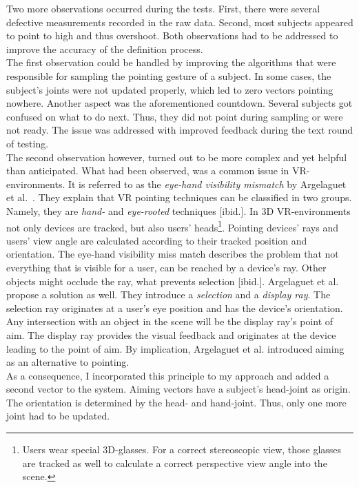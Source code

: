 Two more observations occurred during the tests. First, there were several defective measurements recorded in the raw data. Second, most subjects appeared to point to high and thus overshoot. Both observations had to be addressed to improve the accuracy of the definition process.
\\
The first observation could be handled by improving the algorithms that were responsible for sampling the pointing gesture of a subject. In some cases, the subject's joints were not updated properly, which led to zero vectors pointing nowhere. Another aspect was the aforementioned countdown. Several subjects got confused on what to do next. Thus, they did not point during sampling or were not ready. The issue was addressed with improved feedback during the text round of testing.
\\
The second observation however, turned out to be more complex and yet helpful than anticipated. What had been observed, was a common issue in \ac{VR}-environments. It is referred to as the \textit{eye-hand visibility mismatch} by Argelaguet et al.~\cite{EyeHandMissmatchVR}. They explain that \ac{VR} pointing techniques can be classified in two groups. Namely, they are \textit{hand-} and \textit{eye-rooted} techniques [ibid.]. In \ac{3D} \ac{VR}-environments not only devices are tracked, but also users' heads\footnote{Users wear special \ac{3D}-glasses. For a correct stereoscopic view, those glasses are tracked as well to calculate a correct perspective view angle into the scene.}. Pointing devices' rays and users' view angle are calculated according to their tracked position and orientation. The eye-hand visibility miss match describes the problem that not everything that is visible for a user, can be reached by a device's ray. Other objects might occlude the ray, what prevents selection [ibid.]. Argelaguet et al. propose a solution as well. They introduce a \textit{selection} and a \textit{display ray}. The selection ray originates at a user's eye position and has the device's orientation. Any intersection with an object in the scene will be the display ray's point of aim. The display ray provides the visual feedback and originates at the device leading to the point of aim. By implication, Argelaguet et al. introduced aiming as an alternative to pointing. 
\\
As a consequence, I incorporated this principle to my approach and added a second vector to the system. Aiming vectors have a subject's head-joint as origin. The orientation is determined by the head- and hand-joint. Thus, only one more joint had to be updated.

